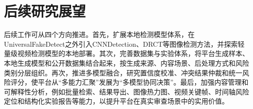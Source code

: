 \section{后续研究展望}

后续工作可从四个方向推进。首先，扩展本地检测模型体系，在UniversalFakeDetect之外引入CNNDetection、DRCT等图像检测方法，并探索轻量级视频检测模型的本地部署。其次，完善数据集与实验体系，将平台生成样本、本地生成模型和公开数据集结合起来，按生成来源、内容场景、后处理方式和风险类别分层组织。再次，推进多模型融合，研究置信度校准、冲突结果仲裁和统一风险评分，使平台从“多能力汇聚”发展为“多模型协同决策”。最后，加强内容管理和可解释性分析，例如批量检索、结果导出、图像热力图、视频关键帧、时间轴风险定位和结构化实验报告等能力，以提升平台在真实审查场景中的实用价值。
